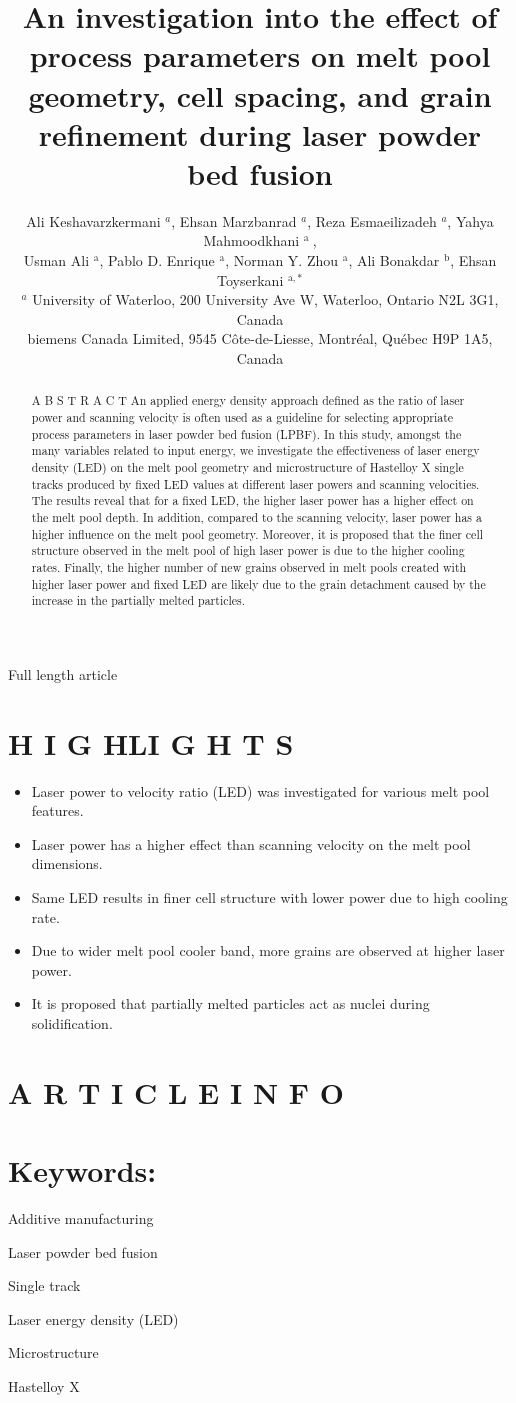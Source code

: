 \documentclass[10pt]{article}
\title{An investigation into the effect of process parameters on melt pool geometry, cell spacing, and grain refinement during laser powder bed fusion }
\author{Ali Keshavarzkermani ${ }^{a}$, Ehsan Marzbanrad ${ }^{a}$, Reza Esmaeilizadeh ${ }^{a}$, Yahya Mahmoodkhani ${ }^{\text {a }}$,\\
Usman Ali ${ }^{\mathrm{a}}$, Pablo D. Enrique ${ }^{\mathrm{a}}$, Norman Y. Zhou ${ }^{\mathrm{a}}$, Ali Bonakdar ${ }^{\mathrm{b}}$, Ehsan Toyserkani ${ }^{\mathrm{a}, *}$\\
${ }^{a}$ University of Waterloo, 200 University Ave W, Waterloo, Ontario N2L 3G1, Canada\\
biemens Canada Limited, 9545 Côte-de-Liesse, Montréal, Québec H9P 1A5, Canada}
\date{}
\begin{document}
\maketitle
Full length article



\section*{H I G HLI G H T S}
\begin{itemize}
  \item Laser power to velocity ratio (LED) was investigated for various melt pool features.
  \item Laser power has a higher effect than scanning velocity on the melt pool dimensions.
  \item Same LED results in finer cell structure with lower power due to high cooling rate.
  \item Due to wider melt pool cooler band, more grains are observed at higher laser power.
  \item It is proposed that partially melted particles act as nuclei during solidification.
\end{itemize}

\section*{A R T I C L E I N F O}
\section*{Keywords:}
Additive manufacturing

Laser powder bed fusion

Single track

Laser energy density (LED)

Microstructure

Hastelloy $\mathrm{X}$

\begin{abstract}
A B S T R A C T An applied energy density approach defined as the ratio of laser power and scanning velocity is often used as a guideline for selecting appropriate process parameters in laser powder bed fusion (LPBF). In this study, amongst the many variables related to input energy, we investigate the effectiveness of laser energy density (LED) on the melt pool geometry and microstructure of Hastelloy X single tracks produced by fixed LED values at different laser powers and scanning velocities. The results reveal that for a fixed LED, the higher laser power has a higher effect on the melt pool depth. In addition, compared to the scanning velocity, laser power has a higher influence on the melt pool geometry. Moreover, it is proposed that the finer cell structure observed in the melt pool of high laser power is due to the higher cooling rates. Finally, the higher number of new grains observed in melt pools created with higher laser power and fixed LED are likely due to the grain detachment caused by the increase in the partially melted particles.
\end{abstract}
\end{document}
